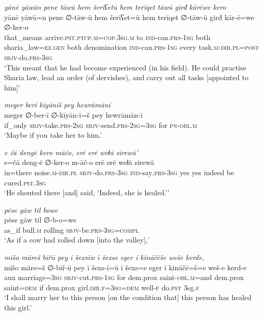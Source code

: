 \ea \label{ZP.19}
\textit{yānē yāwān pene tāwū hem šerīʕetū hem terīqet tāwū girđ kārēwe kero} \\ 
\gll yānē yāwā=n pene ∅-tāw-ū hem šerīʕet=ū hem terīqet ∅-tāw-ū girđ kār-ē=we ∅-ker-o \\ 
 that\_means arrive\textsc{.pst}\textsc{.ptcp}\textsc{.m}\textsc{=cop}\textsc{.3sg}\textsc{.m} to \textsc{ind-}can\textsc{.prs}\textsc{-\textsc{1sg}} both sharia\_law\textsc{\textsc{=ez.gen}} both denomination \textsc{ind-}can\textsc{.prs}\textsc{-\textsc{1sg}} every task\textsc{.m}\textsc{-dir}\textsc{.pl}\textsc{=\textsc{post}} \textsc{sbjv-}do\textsc{.prs}\textsc{-3sg} \\ 
\glt `This meant that he had become experienced (in his field). He could practise Sharia law, lead an order (of dervishes), and carry out all tasks [appointed to him]'
\z 
 
\ea \label{ZP.34}
\textit{meger berī kīyānīš pey hewrāmānī} \\ 
\gll meger ∅-ber-ī ∅-kīyān-ī=š pey hewrāmān-ī \\ 
 if\_only \textsc{sbjv-}take\textsc{.prs}-\textsc{2sg} \textsc{sbjv-}send\textsc{.prs}-\textsc{2sg}\textsc{=3sg} for \textsc{pn}\textsc{-obl}\textsc{.m} \\ 
\glt `Maybe if you take her to him.'
\z 
 
\ea \label{ZP.60}
\textit{e čā dengē kero māčo, erē erē weɫā sirewā’} \\ 
\gll e=čā deng-ē ∅-ker-o m-āč-o erē erē weɫā sirewā \\ 
 in=there noise\textsc{.m}\textsc{-dir}\textsc{.pl} \textsc{sbjv-}do\textsc{.prs}\textsc{-3sg} \textsc{ind-}say\textsc{.prs}\textsc{-3sg} yes yes indeed be cured\textsc{.pst}\textsc{.3sg} \\ 
\glt `He shouted there [and] said, ‘Indeed, she is healed.’'
\z 
 
\ea \label{ZP.79}
\textit{pēse gāw til bowe} \\ 
\gll pēse gāw til ∅-b-o=we \\ 
 as\_if bull\textsc{.m} rolling \textsc{sbjv-}be\textsc{.prs}\textsc{-3sg}\textsc{=compl} \\ 
\glt `As if a cow had rolled down [into the valley],'
\z 
 
\ea \label{ZP.90}
\textit{mišo māreš biřū pey ī šexsīw ī šexse eger ī kināčēše weše kerde,} \\ 
\gll mišo māre=š ∅-biř-ū pey ī šexs-ī=ū ī šexs=e eger ī kināčē=š=e weš-e kerd-e \\ 
 aux marriage\textsc{=3sg} \textsc{sbjv-}cut\textsc{.prs}\textsc{-\textsc{1sg}} for dem.prox saint\textsc{-obl}\textsc{.m}=and dem.prox saint\textsc{=dem} if dem.prox girl\textsc{.dir}\textsc{.f}\textsc{=3sg}\textsc{=dem} well\textsc{-f} do\textsc{.pst} 3sg\textsc{.f} \\ 
\glt `I shall marry her to this person [on the condition that] this person has healed this girl.'
\z 
 
